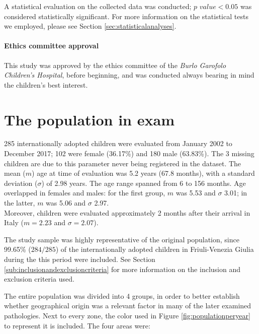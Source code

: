 A statistical evaluation on the collected data was conducted; $p$ $value < 0.05$ was considered statistically significant. For more information on the statistical tests we employed, please see Section \ref{sec:statisticalanalyses}.

\paragraph*{Ethics committee approval} This study was approved by the ethics committee of the \textit{Burlo Garofolo Children's Hospital}, before beginning, and was conducted always bearing in mind the children's best interest. 


\section{The population in exam}\label{sec:thepopulationinexam}
285 internationally adopted children were evaluated from January  2002 to December  2017; 102 were female (36.17\%) and 180 male (63.83\%). The 3 missing children are due to this parameter never being registered in the dataset. The mean ($m$) age at time of evaluation was 5.2 years (67.8 months), with a standard deviation ($\sigma$) of 2.98 years. The age range spanned from 6 to 156 months. Age overlapped in females and males: for the first group, $m$ was 5.53 and $\sigma$ 3.01; in the latter, $m$ was 5.06 and $\sigma$ 2.97.\\
Moreover, children were evaluated approximately 2 months after their arrival in Italy ($m = 2.23$ and $\sigma = 2.07$).

The study sample was highly representative of the original population, since 99.65\% ($284/285$) of the internationally adopted children in Friuli-Venezia Giulia during the this period were included. See Section \ref{sub:inclusionandexclusioncriteria} for more information on the inclusion and exclusion criteria used.

The entire population was divided into 4 groups, in order to better establish whether geographical origin was a relevant factor in many of the later examined pathologies. Next to every zone, the color used in Figure \ref{fig:populationperyear} to represent it is included. The four areas were:

